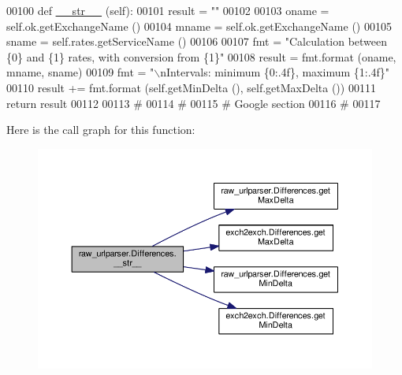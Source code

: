 \begin{DoxyCode}
00100     \textcolor{keyword}{def }\hyperlink{namespacerates_a2f1a70c33ee9e255938e4c19fd207264}{\_\_str\_\_} (self):
00101         result = \textcolor{stringliteral}{""}
00102         
00103         oname = self.ok.getExchangeName ()
00104         mname = self.ok.getExchangeName ()
00105         sname = self.rates.getServiceName ()
00106         
00107         fmt = \textcolor{stringliteral}{"Calculation between \{0\} and \{1\} rates, with conversion from \{1\}"}
00108         result = fmt.format (oname, mname, sname)
00109         fmt = \textcolor{stringliteral}{"\(\backslash\)nIntervals: minimum \{0:.4f\}, maximum \{1:.4f\}"}
00110         result += fmt.format (self.getMinDelta (), self.getMaxDelta ())
00111         \textcolor{keywordflow}{return} result
00112 
00113 \textcolor{comment}{#        }
00114 \textcolor{comment}{# }
00115 \textcolor{comment}{# Google section }
00116 \textcolor{comment}{#}
00117 
\end{DoxyCode}
Here is the call graph for this function\+:
\nopagebreak
\begin{figure}[H]
\begin{center}
\leavevmode
\includegraphics[width=350pt]{classraw__urlparser_1_1_differences_ae30a248dbbe9fde42b0bcbd81160f070_cgraph}
\end{center}
\end{figure}
\mbox{\label{classraw__urlparser_1_1_differences_acfa09d743c08cc813a5bc435aa6875da}} 

